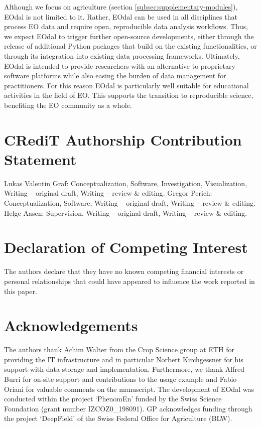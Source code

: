 Although we focus on agriculture (section \ref{subsec:supplementary-modules}), \gls{EOdal} is not limited to it. Rather, EOdal can be used in all disciplines that process \gls{EO} data and require open, reproducible data analysis workflows. Thus, we expect EOdal to trigger further open-source developments, either through the release of additional Python packages that build on the existing functionalities, or through its integration into existing data processing frameworks. Ultimately, \gls{EOdal} is intended to provide researchers with an alternative to proprietary software platforms while also easing the burden of data management for practitioners. For this reason EOdal is particularly well suitable for educational activities in the field of \gls{EO}. This supports the transition to reproducible science, benefiting the \gls{EO} community as a whole.

\section*{CRediT Authorship Contribution Statement}
Lukas Valentin Graf: Conceptualization, Software, Investigation, Visualization, Writing – original draft, Writing – review \& editing. Gregor Perich: Conceptualization, Software, Writing – original draft, Writing – review \& editing. Helge Aasen: Supervision, Writing – original draft, Writing – review \& editing.

\section*{Declaration of Competing Interest}
The authors declare that they have no known competing financial interests or personal relationships that could have appeared to influence the work reported in this paper.

\section*{Acknowledgements}
The authors thank Achim Walter from the Crop Science group at ETH for providing the IT infrastructure and in particular Norbert Kirchgessner for his support with data storage and implementation. Furthermore, we thank Alfred Burri for on-site support and contributions to the usage example and Fabio Oriani for valuable comments on the manuscript. The development of EOdal was conducted within the project `PhenomEn' funded by the Swiss Science Foundation (grant number IZCOZ0\_198091). GP acknowledges funding through the project `DeepField' of the Swiss Federal Office for Agriculture (BLW). 
